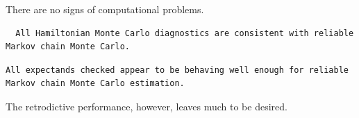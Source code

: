 \documentclass[
  letterpaper,
  DIV=11,
  numbers=noendperiod]{scrartcl}
\newenvironment{Shaded}{\begin{snugshade}}{\end{snugshade}}
\newcommand{\FunctionTok}[1]{\textcolor[rgb]{0.28,0.35,0.67}{#1}}
\newcommand{\NormalTok}[1]{\textcolor[rgb]{0.00,0.23,0.31}{#1}}
\newcommand{\OtherTok}[1]{\textcolor[rgb]{0.00,0.23,0.31}{#1}}
\newcommand{\SpecialCharTok}[1]{\textcolor[rgb]{0.37,0.37,0.37}{#1}}
\newcommand{\StringTok}[1]{\textcolor[rgb]{0.13,0.47,0.30}{#1}}
\begin{document}
There are no signs of computational problems.

\begin{Shaded}
\end{Shaded}

\begin{verbatim}
  All Hamiltonian Monte Carlo diagnostics are consistent with reliable
Markov chain Monte Carlo.
\end{verbatim}

\begin{Shaded}
\end{Shaded}

\begin{verbatim}
All expectands checked appear to be behaving well enough for reliable
Markov chain Monte Carlo estimation.
\end{verbatim}

The retrodictive performance, however, leaves much to be desired.
\end{document}
